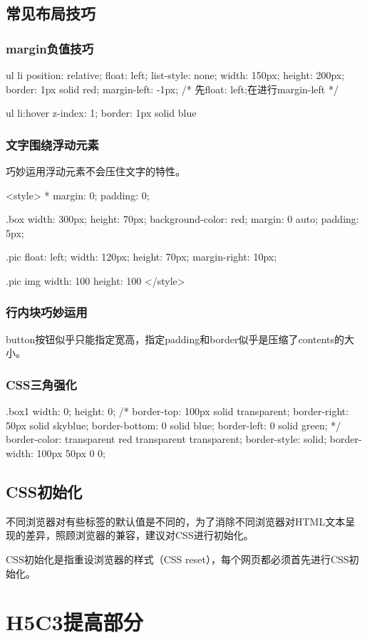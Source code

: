 \section{常见布局技巧}
\subsection{margin负值技巧}
\begin{css}
    ul li {
            position: relative;
            float: left;
            list-style: none;
            width: 150px;
            height: 200px;
            border: 1px solid red;
            margin-left: -1px;
            /* 先float: left;在进行margin-left */
        }

    ul li:hover {
    z-index: 1;
    border: 1px solid blue
    }
\end{css}
\subsection{文字围绕浮动元素}
巧妙运用浮动元素不会压住文字的特性。
\begin{css}
    <style>
    * {
            margin: 0;
            padding: 0;
        }

    .box {
            width: 300px;
            height: 70px;
            background-color: red;
            margin: 0 auto;
            padding: 5px;
        }

    .pic {
            float: left;
            width: 120px;
            height: 70px;
            margin-right: 10px;
        }

    .pic img {
            width: 100%
            height: 100%
        }
    </style>
\end{css}
\subsection{行内块巧妙运用}
button按钮似乎只能指定宽高，指定padding和border似乎是压缩了contents的大小。

\subsection{CSS三角强化}
\begin{css}
    .box1 {
    width: 0;
    height: 0;
    /* border-top: 100px solid transparent;
    border-right: 50px solid skyblue;
    border-bottom: 0 solid blue;
    border-left: 0 solid green; */
    border-color: transparent red transparent transparent;
    border-style: solid;
    border-width: 100px 50px 0 0;
    }
\end{css}
\section{CSS初始化}
不同浏览器对有些标签的默认值是不同的，为了消除不同浏览器对HTML文本呈现的差异，照顾浏览器的兼容，建议对CSS进行初始化。

CSS初始化是指重设浏览器的样式（CSS reset），每个网页都必须首先进行CSS初始化。
\chapter{H5C3提高部分}